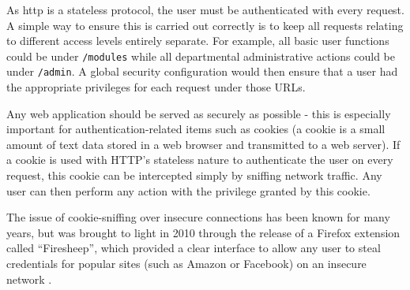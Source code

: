 
As \gls{http} is a stateless protocol, the user must be authenticated with
every request. A simple way to ensure this is carried out correctly is to keep
all requests relating to different access levels entirely separate. For
example, all basic user functions could be under \texttt{/modules} while all
departmental administrative actions could be under \texttt{/admin}. A global
security configuration would then ensure that a user had the appropriate
privileges for each request under those URLs.


Any web application should be served as securely as possible - this is
especially important for authentication-related items such as cookies (a
cookie is a small amount of text data stored in a web browser and transmitted
to a web server). If a cookie is used with HTTP's stateless nature to
authenticate the user on every request, this cookie can be intercepted simply
by sniffing network traffic. Any user can then perform any action with the
privilege granted by this cookie.

The issue of cookie-sniffing over insecure connections has been known for many
years, but was brought to light in 2010 through the release of a Firefox
extension called ``Firesheep'', which provided a clear interface to allow any
user to steal credentials for popular sites (such as Amazon or Facebook) on an
insecure network \cite{FiresheepHow_2011}.
